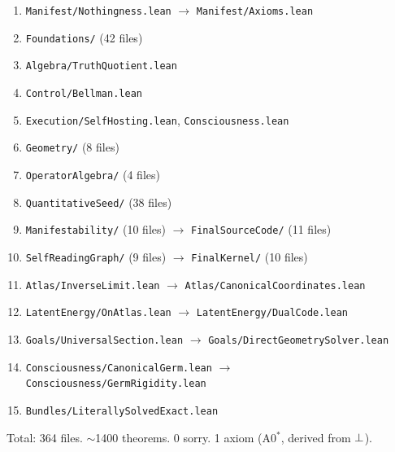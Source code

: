 \begin{enumerate}[nosep]
\item \texttt{Manifest/Nothingness.lean} $\to$ \texttt{Manifest/Axioms.lean}
\item \texttt{Foundations/} (42 files)
\item \texttt{Algebra/TruthQuotient.lean}
\item \texttt{Control/Bellman.lean}
\item \texttt{Execution/SelfHosting.lean}, \texttt{Consciousness.lean}
\item \texttt{Geometry/} (8 files)
\item \texttt{OperatorAlgebra/} (4 files)
\item \texttt{QuantitativeSeed/} (38 files)
\item \texttt{Manifestability/} (10 files) $\to$ \texttt{FinalSourceCode/} (11 files)
\item \texttt{SelfReadingGraph/} (9 files) $\to$ \texttt{FinalKernel/} (10 files)
\item \texttt{Atlas/InverseLimit.lean} $\to$ \texttt{Atlas/CanonicalCoordinates.lean}
\item \texttt{LatentEnergy/OnAtlas.lean} $\to$ \texttt{LatentEnergy/DualCode.lean}
\item \texttt{Goals/UniversalSection.lean} $\to$ \texttt{Goals/DirectGeometrySolver.lean}
\item \texttt{Consciousness/CanonicalGerm.lean} $\to$ \texttt{Consciousness/GermRigidity.lean}
\item \texttt{Bundles/LiterallySolvedExact.lean}
\end{enumerate}

Total: 364 files.  $\sim$1400 theorems.  0 sorry.  1 axiom (A0$^*$, derived from $\bot$).
